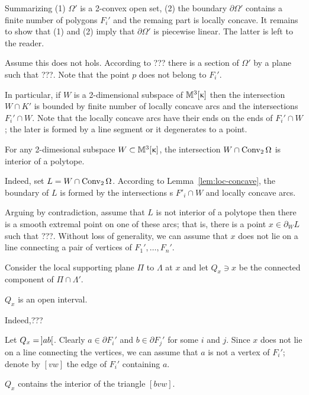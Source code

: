 Summarizing (1)
$\Omega'$ is a 2-convex open set,
(2) the boundary $\partial\Omega'$ 
contains a finite number of polygons $F_i'$
and the remaing part is locally concave.
It remains to show that (1) and (2) imply that $\partial\Omega'$
is piecewise linear.
The latter is left to the reader.

Assume this does not hols. 
According to ??? there is a section of $\Omega'$ by a plane such that ???.
Note that the point $p$ does not belong to $F_i'$.



In particular, if $W$ is a 2-dimensional subspace of $\mathbb{M}_{{}}^{3}[{\upkappa}]$ 
then the intersection $W\cap K'$ is bounded 
by finite number of locally concave arcs and the  intersections $F_i'\cap W$.
Note that the locally concave arcs have their ends on the ends of $F_i'\cap W$;
the later is formed by a line segment or it degenerates to a point.

\begin{clm}{}\label{clm:intersection-is-polytope}
For any 2-dimesional subspace $W\subset\Lob{3}{\kappa}$,
the intersection $W\cap \Conv_2 \Omega$ is interior of a polytope.
\end{clm}

Indeed, set $L=W\cap \Conv_2 \Omega$.
According to Lemma~\ref{lem:loc-concave}, 
the boundary of $L$ is formed by the intersections s $F'_i\cap W$
and locally concave arcs.

Arguing by contradiction, 
assume that $L$ is not interior of a polytope then there is a smooth extremal point on one of these arcs; 
that is, there is a point $x\in\partial_W L$ such that ???.
Without loss of generality, we can assume that $x$ does not lie on a line connecting a pair of vertices of $F_1',\dots,F_n'$.

Consider the local supporting plane $\Pi$ to $\Lambda$ at $x$
and let $Q_x\ni x$ be the connected component of $\Pi\cap\Lambda'$.

\begin{clm}{}\label{clm:Q-is-interval}
$Q_x$ is an open interval. 
\end{clm}

Indeed,???\claimqeds

Let $Q_x=\hskip-0.1em\left]ab\right[$.
Clearly $a\in\partial F_i'$ and $b\in\partial F_j'$
for some $i$ and $j$.
Since $x$ does not lie on a line connecting the vertices,
we can assume that $a$ is not a vertex of $F_i'$;
denote by $[vw]$ the edge of $F_i'$ containing $a$.

\begin{clm}{}\label{clm:[vw]cPi}
$Q_x$ contains the interior of the triangle $[bvw]$.
\end{clm}

